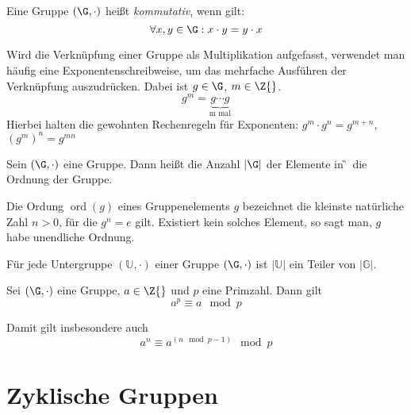 \begin{definition}
  Eine Gruppe $(\G, \cdot)$ heißt \textit{kommutativ}, wenn gilt:
\[
  \forall x, y \in \G: x \cdot y = y \cdot x
\]
\end{definition}

\begin{definition}
Wird die Verknüpfung einer Gruppe als Multiplikation aufgefasst,
verwendet man häufig eine Exponentenschreibweise, um das mehrfache
Ausführen der Verknüpfung auszudrücken. Dabei ist $g\in \G$, $m \in \Z{}$.
\[ g^m = \underbrace{g\cdots g}_{\text{m mal}} \]
Hierbei halten die gewohnten Rechenregeln für Exponenten: $g^m\cdot g^n =
g^{m+n}$, $(g^m)^n = g^{mn}$
\end{definition}


\begin{definition}
  Sein $(\G, \cdot)$ eine Gruppe. Dann heißt die Anzahl $|\G|$ der Elemente in
  \G~die Ordnung der Gruppe.
\end{definition}

\begin{definition}
  Die Ordung $\operatorname{ord}(g) $ eines Gruppenelements $g$
  bezeichnet die kleinste 
  natürliche Zahl $n>0$, für die $g^n = e$ gilt. Existiert kein solches
  Element, so sagt man, $g$ habe unendliche Ordnung.
 \end{definition}

 \begin{theorem}
   Für jede Untergruppe $(\mathbb{U}, \cdot)$ einer Gruppe $(\G, \cdot)$
   ist $|\mathbb{U}|$ ein Teiler von $|\mathbb{G}|$.   
 \end{theorem}

 \begin{theorem}
   Sei $(\G, \cdot)$ eine Gruppe, $a \in \Z{}$ und $p$ eine
   Primzahl. Dann gilt
   \[a^p \equiv a \mod p\]
 \end{theorem}
Damit gilt insbesondere auch
\[a^n \equiv a^{(n \mod p-1)} \mod p\]
\section{Zyklische Gruppen}

